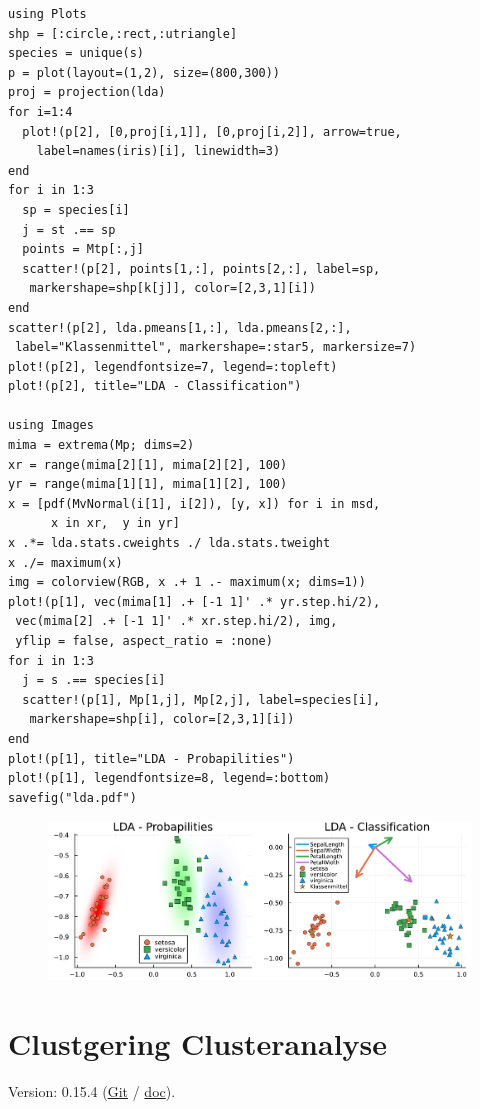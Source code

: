 \documentclass[10pt,twocolumn]{scrartcl}
\begin{document}
\begin{lstlisting}
using Plots
shp = [:circle,:rect,:utriangle]
species = unique(s)
p = plot(layout=(1,2), size=(800,300))
proj = projection(lda)
for i=1:4
  plot!(p[2], [0,proj[i,1]], [0,proj[i,2]], arrow=true,
    label=names(iris)[i], linewidth=3)
end
for i in 1:3
  sp = species[i]
  j = st .== sp
  points = Mtp[:,j]
  scatter!(p[2], points[1,:], points[2,:], label=sp,
   markershape=shp[k[j]], color=[2,3,1][i])
end
scatter!(p[2], lda.pmeans[1,:], lda.pmeans[2,:],
 label="Klassenmittel", markershape=:star5, markersize=7)
plot!(p[2], legendfontsize=7, legend=:topleft)
plot!(p[2], title="LDA - Classification")

using Images
mima = extrema(Mp; dims=2)
xr = range(mima[2][1], mima[2][2], 100)
yr = range(mima[1][1], mima[1][2], 100)
x = [pdf(MvNormal(i[1], i[2]), [y, x]) for i in msd,
      x in xr,  y in yr]
x .*= lda.stats.cweights ./ lda.stats.tweight
x ./= maximum(x)
img = colorview(RGB, x .+ 1 .- maximum(x; dims=1))
plot!(p[1], vec(mima[1] .+ [-1 1]' .* yr.step.hi/2),
 vec(mima[2] .+ [-1 1]' .* xr.step.hi/2), img,
 yflip = false, aspect_ratio = :none)
for i in 1:3
  j = s .== species[i]
  scatter!(p[1], Mp[1,j], Mp[2,j], label=species[i],
   markershape=shp[i], color=[2,3,1][i])
end
plot!(p[1], title="LDA - Probapilities")
plot!(p[1], legendfontsize=8, legend=:bottom)
savefig("lda.pdf")
\end{lstlisting}

\begin{figure}[ht]
  \centering
  \includegraphics[width=.95\columnwidth]{lda.pdf}
\end{figure}

\section{Clustgering Clusteranalyse}

Version: 0.15.4
(\href{https://github.com/JuliaStats/Clustering.jl}{Git} /
\href{https://juliastats.org/Clustering.jl}{doc}).
\end{document}
